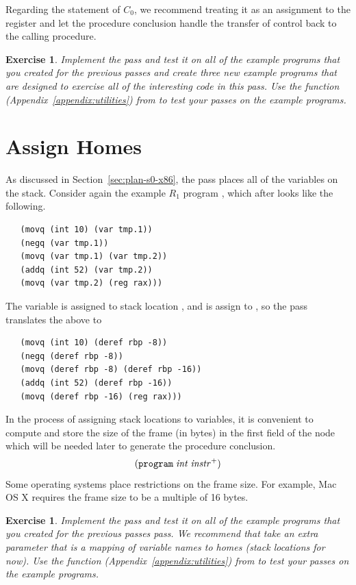 \documentclass[11pt]{book}
\newtheorem{exercise}[theorem]{Exercise}
\begin{document}
Regarding the \RETURN{\Arg} statement of $C_0$, we recommend treating it
as an assignment to the  register and let the procedure
conclusion handle the transfer of control back to the calling
procedure.

\begin{exercise}
\normalfont
Implement the  pass and test it on all of the
example programs that you created for the previous passes and create
three new example programs that are designed to exercise all of the
interesting code in this pass. Use the  function
(Appendix~\ref{appendix:utilities}) from  to test
your passes on the example programs.
\end{exercise}

\section{Assign Homes}
\label{sec:assign-s0}

As discussed in Section~\ref{sec:plan-s0-x86}, the
 pass places all of the variables on the stack.
Consider again the example $R_1$ program ,
which after  looks like the following.
\begin{lstlisting}
   (movq (int 10) (var tmp.1))
   (negq (var tmp.1))
   (movq (var tmp.1) (var tmp.2))
   (addq (int 52) (var tmp.2))
   (movq (var tmp.2) (reg rax)))
\end{lstlisting}
The variable  is assigned to stack location
, and  is assign to , so
the  pass translates the above to
\begin{lstlisting}
   (movq (int 10) (deref rbp -8))
   (negq (deref rbp -8))
   (movq (deref rbp -8) (deref rbp -16))
   (addq (int 52) (deref rbp -16))
   (movq (deref rbp -16) (reg rax)))
\end{lstlisting}

In the process of assigning stack locations to variables, it is
convenient to compute and store the size of the frame (in bytes) in
the first field of the  node which will be needed later
to generate the procedure conclusion.
\[
  (\texttt{program}\;\mathit{int}\;\mathit{instr}^{+})
\]
Some operating systems place restrictions on
the frame size. For example, Mac OS X requires the frame size to be a
multiple of 16 bytes.

\begin{exercise}
\normalfont Implement the  pass and test it on all
of the example programs that you created for the previous passes pass.
We recommend that  take an extra parameter that is a
mapping of variable names to homes (stack locations for now).  Use the
 function (Appendix~\ref{appendix:utilities}) from
 to test your passes on the example programs.
\end{exercise}
\end{document}

